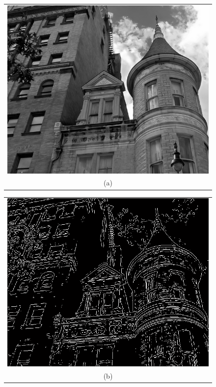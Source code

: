 \begin{figure}[h!]
\centering
\begin{minipage}{.45\textwidth}
\begin{tabular}{c}
\includegraphics[width=.9\textwidth]{backgroundTheory/segmentation/Building} \\
(a)
\end{tabular}
\end{minipage}
\begin{minipage}{.45\textwidth}
\begin{tabular}{c}
\includegraphics[width=.9\textwidth]{backgroundTheory/segmentation/LoG} \\
(b)
\end{tabular}

\end{minipage}
\end{figure}
